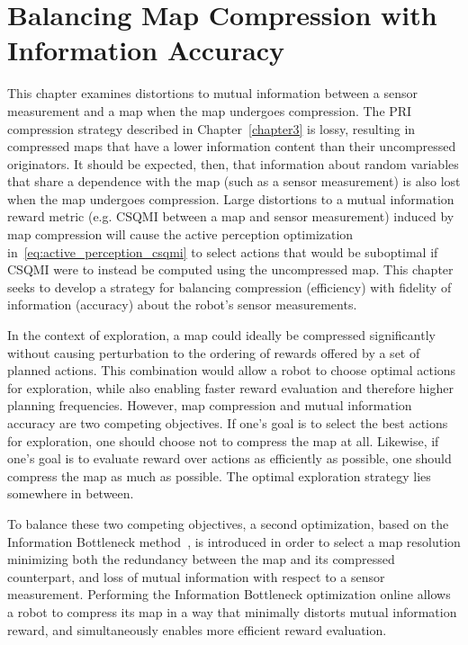 \chapter{Balancing Map Compression with Information Accuracy}
\label{chapter4}

This chapter examines distortions to mutual information between a sensor
measurement and a map when the map undergoes compression. The PRI
compression strategy described in Chapter~\ref{chapter3} is lossy, resulting in
compressed maps that have a lower information content than their uncompressed
originators. It should be expected, then, that information about
random variables that share a dependence with the map (such as a sensor measurement) is also lost
when the map undergoes compression. Large distortions to a mutual information reward metric
(e.g. CSQMI between a map and sensor measurement) induced by map compression will cause the active perception optimization
in~\eqref{eq:active_perception_csqmi} to select actions that would be suboptimal
if CSQMI were to instead be computed using the uncompressed map. This chapter
seeks to develop a strategy for balancing compression (efficiency) with fidelity of information
(accuracy) about the robot's sensor measurements.

In the context of exploration, a map could ideally be compressed significantly
without causing perturbation to the ordering of rewards offered by a set of planned
actions. This combination would allow a robot to choose optimal actions for
exploration, while also enabling faster reward evaluation and therefore higher
planning frequencies. However, map compression and mutual information accuracy
are two competing objectives. If one's goal is to select the best actions for
exploration, one should choose not to compress the map at all. Likewise, if one's
goal is to evaluate reward over actions as efficiently as possible, one should
compress the map as much as possible. The optimal exploration strategy lies somewhere in between.

To balance these two competing objectives, a second
optimization, based on the Information Bottleneck
method~\cite{tishby2000information}, is introduced in order to select a map
resolution minimizing both the redundancy between the map and its compressed counterpart,
and loss of mutual information with respect to a sensor measurement. Performing
the Information Bottleneck optimization online allows a robot to compress its map in a way that
minimally distorts mutual information reward, and simultaneously enables more
efficient reward evaluation.

